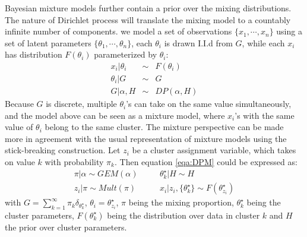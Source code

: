 Bayesian mixture models further contain a prior over the mixing distributions. The nature of Dirichlet process will translate the mixing model to a countably infinite number of components. we model a set of observations $\{x_1,\cdots,x_n\}$ using a set of latent parameters  $\{\theta_1,\cdots,\theta_n\}$, each $\theta_i$ is drawn I.I.d from $G$, while each $x_i$ has distribution $F(\theta_i)$ parameterized by $\theta_i$:
\begin{eqnarray}
	x_i|\theta_i&\sim& F(\theta_i)\nonumber\\
	\theta_i|G&\sim& G\\
	G|\alpha,H&\sim& DP(\alpha,H)\nonumber \label{eqa:DPM}
\end{eqnarray}
Because $G$ is discrete, multiple $\theta_i$'s can take on the same value simultaneously, and the model above can be seen as a mixture model, where $x_i$'s with the same value of $\theta_i$ belong to the same cluster. The mixture perspective can be made more in agreement with the usual representation of mixture models using the stick-breaking construction. Let $z_i$ be a cluster assignment variable, which takes on value $k$ with probability $\pi_k$. Then equation \ref{eqa:DPM} could be expressed as:
\begin{eqnarray}
	\pi|\alpha\sim GEM(\alpha)& \quad &\theta_k^\star|H\sim H \nonumber \\
	z_i|\pi\sim  Mult(\pi)& \quad & x_i|z_i,\{\theta_k^\star\} \sim F(\theta_{z_i}^\star)
\end{eqnarray}
with $G=\sum\nolimits_{k=1}^\infty\pi_k\delta_{\theta_k^\star}$,  $\theta_i=\theta_{z_i}^\star$, $\pi$ being the mixing proportion, $\theta_k^\star$ being the cluster parameters, $F(\theta_k^\star)$ being the distribution over data in cluster $k$ and $H$ the prior over cluster parameters.

